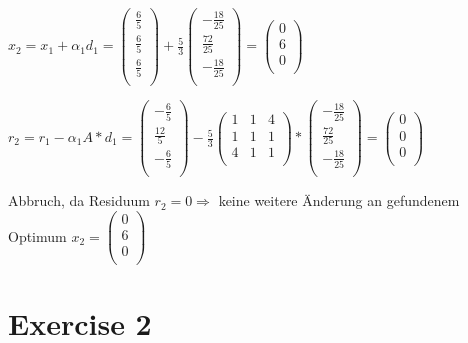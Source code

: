 \documentclass[10pt,DIV10,a4paper]{scrartcl}
\begin{document}
\(x_2=x_1+\alpha _1d_1= \left(
\begin{array}{c}
 \frac{6}{5} \\
 \frac{6}{5} \\
 \frac{6}{5} \\
\end{array}
\right) + \frac{5}{3}\left(
\begin{array}{c}
 -\frac{18}{25} \\
 \frac{72}{25} \\
 -\frac{18}{25} \\
\end{array}
\right)=\left(
\begin{array}{c}
 0 \\
 6 \\
 0 \\
\end{array}
\right)\text{}\)

\(r_2=r_1-\alpha _1 A * d_1= \left(
\begin{array}{c}
 -\frac{6}{5} \\
 \frac{12}{5} \\
 -\frac{6}{5} \\
\end{array}
\right) - \frac{5}{3}\left(
\begin{array}{ccc}
 1 & 1 & 4 \\
 1 & 1 & 1 \\
 4 & 1 & 1 \\
\end{array}
\right) * \left(
\begin{array}{c}
 -\frac{18}{25} \\
 \frac{72}{25} \\
 -\frac{18}{25} \\
\end{array}
\right)=\left(
\begin{array}{c}
 0 \\
 0 \\
 0 \\
\end{array}
\right)\)

Abbruch, da Residuum \(r_2=0 \Rightarrow\) keine weitere {\" A}nderung an gefundenem Optimum \(x_2=\left(
\begin{array}{c}
 0 \\
 6 \\
 0 \\
\end{array}
\right)\)

\section*{Exercise 2}
\end{document}

